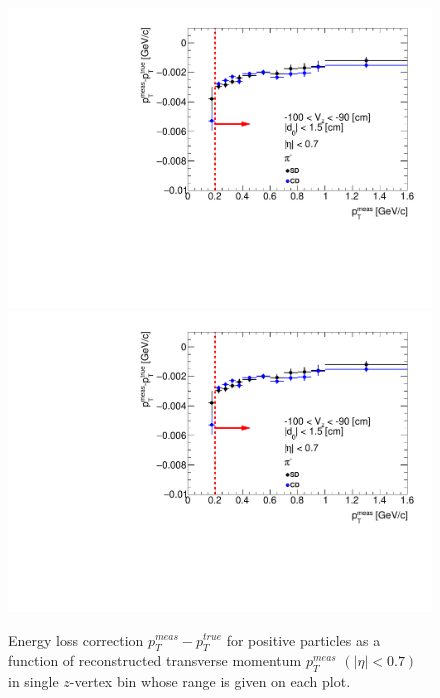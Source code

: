 \begin{figure}[H]
\caption[Energy loss correction for positive particles as a function of reconstructed transverse momentum $p_T^{meas}$.]{Energy loss correction $p_T^{meas}-p_T^{true}$ for positive particles as a function of reconstructed transverse momentum $p_T^{meas}$ $\left(|\eta|<0.7\right)$ in single $z$-vertex bin whose range is given on each plot.}\label{fig:energyLossPrimaryPositive}
\parbox{0.329\textwidth}{
  \includegraphics[width=\linewidth,page=143]{graphics/energyLoss/energyLoss3D_OnePrtAlso.pdf}\\
  \includegraphics[width=\linewidth,page=146]{graphics/energyLoss/energyLoss3D_OnePrtAlso.pdf}\\
}
\end{figure}
